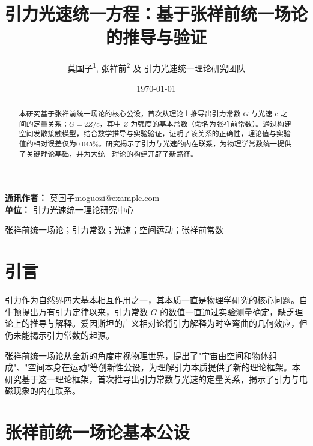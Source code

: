 \documentclass[12pt,a4paper]{article}
\title{
\textbf{引力光速统一方程：基于张祥前统一场论的推导与验证}
}
\author{
莫国子\textsuperscript{1}, 张祥前\textsuperscript{2} 及 引力光速统一理论研究团队
}
\date{\today}
\begin{document}
\begin{titlepage}
\maketitle
\vspace{2cm}
\begin{minipage}{0.9\textwidth}
\noindent\textbf{通讯作者：} 莫国子\quad\href{mailto:moguozi@example.com}{moguozi@example.com}\\
\noindent\textbf{单位：} 引力光速统一理论研究中心
\end{minipage}
\end{titlepage}

\newpage
\setcounter{page}{1}

\begin{abstract}
本研究基于张祥前统一场论的核心公设，首次从理论上推导出引力常数 $G$ 与光速 $c$ 之间的定量关系：$G = 2Z/c$，其中 $Z$ 为强度的基本常数（命名为张祥前常数）。通过构建空间发散接触模型，结合数学推导与实验验证，证明了该关系的正确性，理论值与实验值的相对误差仅为0.045\%。研究揭示了引力与光速的内在联系，为物理学常数统一提供了关键理论基础，并为大统一理论的构建开辟了新路径。
\end{abstract}

\begin{keywords}
张祥前统一场论；引力常数；光速；空间运动；张祥前常数
\end{keywords}

\newpage
\tableofcontents
\newpage

\section{引言}
\label{section:introduction}

引力作为自然界四大基本相互作用之一，其本质一直是物理学研究的核心问题。自牛顿提出万有引力定律以来，引力常数 $G$ 的数值一直通过实验测量确定，缺乏理论上的推导与解释。爱因斯坦的广义相对论将引力解释为时空弯曲的几何效应，但仍未能揭示引力常数的起源。

张祥前统一场论从全新的角度审视物理世界，提出了"宇宙由空间和物体组成"、"空间本身在运动"等创新性公设，为理解引力本质提供了新的理论框架。本研究基于这一理论框架，首次推导出引力常数与光速的定量关系，揭示了引力与电磁现象的内在联系。

\section{张祥前统一场论基本公设}
\label{section:fundamental_postulates}
\end{document}
